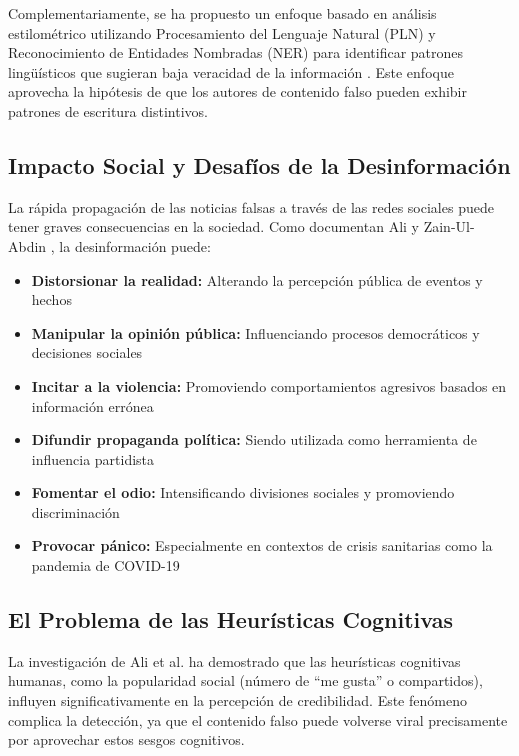 Complementariamente, se ha propuesto un enfoque basado en análisis estilométrico utilizando Procesamiento del Lenguaje Natural (PLN) y Reconocimiento de Entidades Nombradas (NER) para identificar patrones lingüísticos que sugieran baja veracidad de la información \cite{tsai2023stylometric}. Este enfoque aprovecha la hipótesis de que los autores de contenido falso pueden exhibir patrones de escritura distintivos.

\subsection{Impacto Social y Desafíos de la Desinformación}

La rápida propagación de las noticias falsas a través de las redes sociales puede tener graves consecuencias en la sociedad. Como documentan Ali y Zain-Ul-Abdin \cite{ali2020posttruth}, la desinformación puede:

\begin{itemize}
    \item \textbf{Distorsionar la realidad:} Alterando la percepción pública de eventos y hechos
    \item \textbf{Manipular la opinión pública:} Influenciando procesos democráticos y decisiones sociales
    \item \textbf{Incitar a la violencia:} Promoviendo comportamientos agresivos basados en información errónea
    \item \textbf{Difundir propaganda política:} Siendo utilizada como herramienta de influencia partidista
    \item \textbf{Fomentar el odio:} Intensificando divisiones sociales y promoviendo discriminación
    \item \textbf{Provocar pánico:} Especialmente en contextos de crisis sanitarias como la pandemia de COVID-19 \cite{perez2020fake}
\end{itemize}

\subsection{El Problema de las Heurísticas Cognitivas}

La investigación de Ali et al. \cite{ali2021fake} ha demostrado que las heurísticas cognitivas humanas, como la popularidad social (número de ``me gusta'' o compartidos), influyen significativamente en la percepción de credibilidad. Este fenómeno complica la detección, ya que el contenido falso puede volverse viral precisamente por aprovechar estos sesgos cognitivos.

